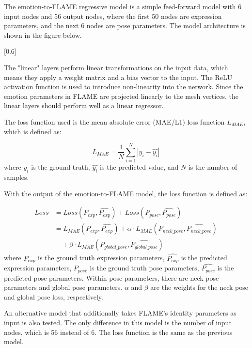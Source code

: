 The emotion-to-FLAME regressive model is a simple feed-forward model with 6 input nodes and 56 output nodes, where the first 50 nodes are expression parameters, and the next 6 nodes are pose parameters. The model architecture is shown in the figure below.

[0.6]

The "linear" layers perform linear transformations on the input data, which means they apply a weight matrix and a bias vector to the input. The ReLU activation function is used to introduce non-linearity into the network. Since the emotion parameters in FLAME are projected linearly to the mesh vertices, the linear layers should perform well as a linear regressor.

The loss function used is the mean absolute error (MAE/L1) loss function $L_{MAE}$, which is defined as:

\begin{equation}
    L_{MAE} = \frac{1}{N}\sum_{i=1}^{N}|y_i-\hat{y_i}|
\end{equation}
where $y_i$ is the ground truth, $\hat{y_i}$ is the predicted value, and $N$ is the number of samples.

With the output of the emotion-to-FLAME model, the loss function is defined as:

\begin{equation}
    \begin{split}
        Loss & = Loss(P_{exp},\hat{P_{exp}}) + Loss(P_{pose},\hat{P_{pose}})                               \\
             & = L_{MAE}(P_{exp},\hat{P_{exp}}) + \alpha\cdot L_{MAE}(P_{neck\_pose},\hat{P_{neck\_pose}}) \\
             & \quad + \beta\cdot L_{MAE}(P_{global\_pose},\hat{P_{global\_pose}})
    \end{split}
\end{equation}
where $P_{exp}$ is the ground truth expression parameters, $\hat{P_{exp}}$ is the predicted expression parameters, $P_{pose}$ is the ground truth pose parameters, $\hat{P_{pose}}$ is the predicted pose parameters. Within pose parameters, there are neck pose parameters and global pose parameters. $\alpha$ and $\beta$ are the weights for the neck pose and global pose loss, respectively.

An alternative model that additionally takes FLAME's identity parameters as input is also tested. The only difference in this model is the number of input nodes, which is 56 instead of 6. The loss function is the same as the previous model.